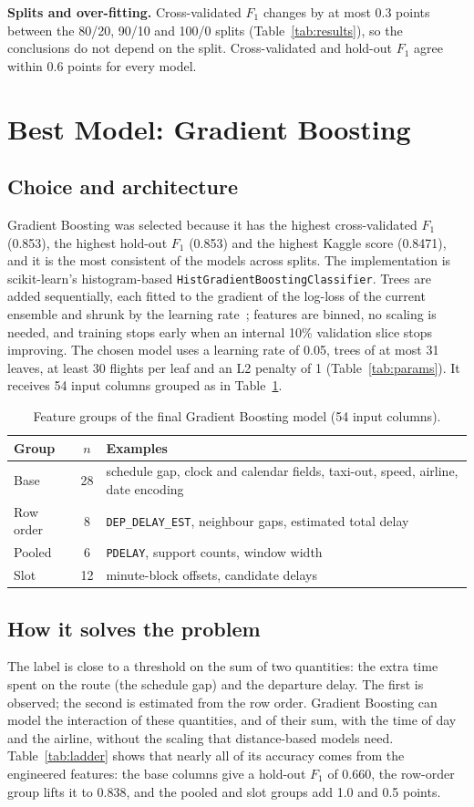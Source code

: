 \documentclass[12pt,a4paper]{article}
\newcommand{\Fone}{$F_1$}
\newcommand{\code}[1]{\texttt{\small #1}}
\begin{document}
\textbf{Splits and over-fitting.} Cross-validated \Fone{} changes by at most 0.3 points between the 80/20, 90/10 and 100/0 splits (Table~\ref{tab:results}), so the conclusions do not depend on the split. Cross-validated and hold-out \Fone{} agree within 0.6 points for every model.

\section{Best Model: Gradient Boosting}
\subsection{Choice and architecture}
Gradient Boosting was selected because it has the highest cross-validated \Fone{} (0.853), the highest hold-out \Fone{} (0.853) and the highest Kaggle score (0.8471), and it is the most consistent of the models across splits. The implementation is scikit-learn's histogram-based \code{HistGradientBoostingClassifier}. Trees are added sequentially, each fitted to the gradient of the log-loss of the current ensemble and shrunk by the learning rate~\cite{gb}; features are binned, no scaling is needed, and training stops early when an internal 10\% validation slice stops improving. The chosen model uses a learning rate of 0.05, trees of at most 31 leaves, at least 30 flights per leaf and an L2 penalty of 1 (Table~\ref{tab:params}). It receives 54 input columns grouped as in Table~\ref{tab:features}.

\begin{table}[t]
\caption{Feature groups of the final Gradient Boosting model (54 input columns).}\label{tab:features}
\small\centering
\begin{tabular}{@{}l c p{}@{}}
\toprule
Group & $n$ & Examples\\
\midrule
Base & 28 & schedule gap, clock and calendar fields, taxi-out, speed, airline, date encoding\\
Row order & 8 & \code{DEP\_DELAY\_EST}, neighbour gaps, estimated total delay\\
Pooled & 6 & \code{PDELAY}, support counts, window width\\
Slot & 12 & minute-block offsets, candidate delays\\
\bottomrule
\end{tabular}
\end{table}

\subsection{How it solves the problem}
The label is close to a threshold on the sum of two quantities: the extra time spent on the route (the schedule gap) and the departure delay. The first is observed; the second is estimated from the row order. Gradient Boosting can model the interaction of these quantities, and of their sum, with the time of day and the airline, without the scaling that distance-based models need. Table~\ref{tab:ladder} shows that nearly all of its accuracy comes from the engineered features: the base columns give a hold-out \Fone{} of 0.660, the row-order group lifts it to 0.838, and the pooled and slot groups add 1.0 and 0.5 points.
\end{document}
